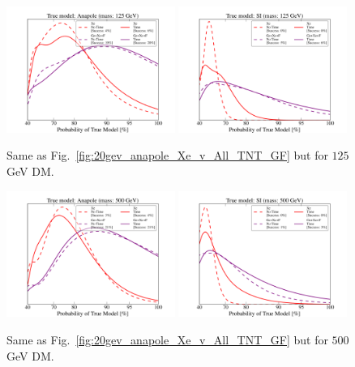 \documentclass[11pt]{article}
\begin{document}
\begin{figure}
\centering
\includegraphics[width=0.49\textwidth, trim=1.cm 0.0cm 1.cm 0.4cm,clip=true]{plots/PDF_Single_125GeV_Anapole_50sims_Xe_vs_FGeXe_GF_TNT.pdf}
\includegraphics[width=0.49\textwidth, trim=1.cm 0.cm 1.cm 0.4cm,clip=true]{plots/PDF_Single_125GeV_SI_Higgs_50sims_Xe_vs_FGeXe_GF_TNT.pdf}
\caption{\label{fig:125gev_anapole_Xe_v_All_TNT_GF}
Same as Fig.~\ref{fig:20gev_anapole_Xe_v_All_TNT_GF} but for $125$ GeV DM.}
\end{figure}


\begin{figure}
\centering
\includegraphics[width=0.49\textwidth, trim=1.cm 0.0cm 1.cm 0.4cm,clip=true]{plots/PDF_Single_500GeV_Anapole_50sims_Xe_vs_FGeXe_GF_TNT.pdf}
\includegraphics[width=0.49\textwidth, trim=1.cm 0.0cm 1.cm 0.4cm,clip=true]{plots/PDF_Single_500GeV_SI_Higgs_50sims_Xe_vs_FGeXe_GF_TNT.pdf}
\caption{\label{fig:500gev_anapole_Xe_v_All_TNT_GF}
Same as Fig.~\ref{fig:20gev_anapole_Xe_v_All_TNT_GF} but for $500$ GeV DM.}
\end{figure}
\end{document}
